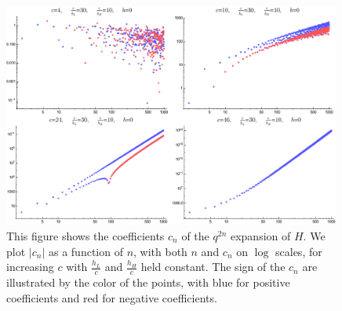 \documentclass[12pt]{article}
\numberwithin{equation}{section}
\begin{document}
\begin{figure}[h]
\begin{centering}
\includegraphics[width=0.99\textwidth]{coeff_evolution}
\caption{ This figure shows the coefficients $c_{n}$ of the $q^{2n}$ expansion of $H$.  We plot $|c_{n}|$ as a function of $n$, with both $n$ and $c_{n}$  on $\log$ scales, for increasing $c$ with $\frac{h_L}{c}$ and $\frac{h_H}{c}$ held constant. The sign of the $c_{n}$ are illustrated by the color of the points, with blue for positive coefficients and red for negative coefficients.}
\label{fig:CoeffEvolution}
\end{centering}
\end{figure}




\end{document}

